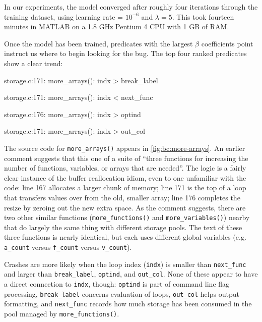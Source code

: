 In our experiments, the model converged after roughly four iterations
through the training dataset, using learning rate = $10^{-6}$ and
$\lambda = 5$.  This took fourteen minutes in MATLAB on a 1.8 GHz
Pentium 4 CPU with 1 GB of RAM.    

Once the model has been trained, predicates with the largest $\beta$
coefficients point instruct us where to begin looking for the bug.
The top four ranked predicates show a clear trend:

\begin{list}{.}{\setlength{\itemsep}{0pt}\setlength{\parsep}{0in}\ttfamily\small}
\item storage.c:171: more\_arrays(): indx > break\_label
\item storage.c:171: more\_arrays(): indx < next\_func
\item storage.c:176: more\_arrays(): indx > optind
\item storage.c:171: more\_arrays(): indx > out\_col
\end{list}

The source code for \texttt{more\_arrays()} appears in
\autoref{fig:bc:more-arrays}.  An earlier comment suggests that this
one of a suite of ``three functions for increasing the number of
functions, variables, or arrays that are needed''.  The logic is a
fairly clear instance of the buffer reallocation idiom, even to one
unfamiliar with the code: line 167 allocates a larger chunk of memory;
line 171 is the top of a loop that transfers values over from the old,
smaller array; line 176 completes the resize by zeroing out the new
extra space.  As the comment suggests, there are two other similar
functions (\texttt{more\_functions()} and \texttt{more\_variables()})
nearby that do largely the same thing with different storage pools.
The text of these three functions is nearly identical, but each uses
different global variables (e.g. \texttt{a\_count} versus
\texttt{f\_count} versus \texttt{v\_count}).

Crashes are more likely when the loop index (\texttt{indx}) is smaller
than \texttt{next\_func} and larger than \texttt{break\_label},
\texttt{optind}, and \texttt{out\_col}.  None of these appear to have
a direct connection to \texttt{indx}, though: \texttt{optind} is part
of command line flag processing, \texttt{break\_label} concerns
evaluation of loops, \texttt{out\_col} helps output formatting, and
\texttt{next\_func} records how much storage has been consumed in the
pool managed by \texttt{more\_functions()}.

